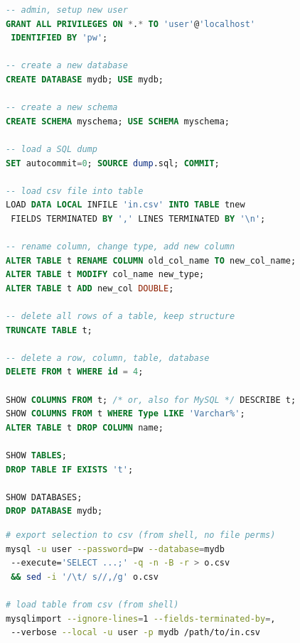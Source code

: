 \begin{lstlisting}[language=SQL]
-- admin, setup new user
GRANT ALL PRIVILEGES ON *.* TO 'user'@'localhost'
 IDENTIFIED BY 'pw';

-- create a new database
CREATE DATABASE mydb; USE mydb;

-- create a new schema
CREATE SCHEMA myschema; USE SCHEMA myschema;

-- load a SQL dump
SET autocommit=0; SOURCE dump.sql; COMMIT;

-- load csv file into table
LOAD DATA LOCAL INFILE 'in.csv' INTO TABLE tnew
 FIELDS TERMINATED BY ',' LINES TERMINATED BY '\n';

-- rename column, change type, add new column
ALTER TABLE t RENAME COLUMN old_col_name TO new_col_name;
ALTER TABLE t MODIFY col_name new_type;
ALTER TABLE t ADD new_col DOUBLE;

-- delete all rows of a table, keep structure
TRUNCATE TABLE t;

-- delete a row, column, table, database
DELETE FROM t WHERE id = 4;

SHOW COLUMNS FROM t; /* or, also for MySQL */ DESCRIBE t;
SHOW COLUMNS FROM t WHERE Type LIKE 'Varchar%';
ALTER TABLE t DROP COLUMN name;

SHOW TABLES;
DROP TABLE IF EXISTS 't';

SHOW DATABASES;
DROP DATABASE mydb;
\end{lstlisting}

\begin{lstlisting}[language=bash]
# export selection to csv (from shell, no file perms)
mysql -u user --password=pw --database=mydb
 --execute='SELECT ...;' -q -n -B -r > o.csv
 && sed -i '/\t/ s//,/g' o.csv

# load table from csv (from shell)
mysqlimport --ignore-lines=1 --fields-terminated-by=,
 --verbose --local -u user -p mydb /path/to/in.csv
\end{lstlisting}

